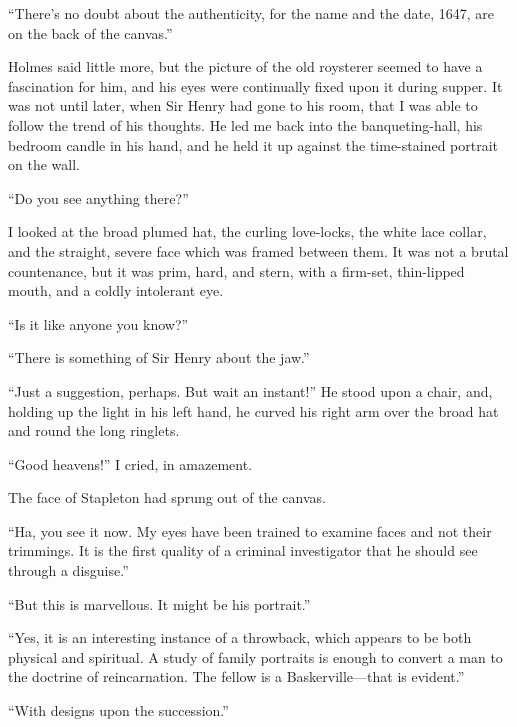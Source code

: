 \documentclass[paper=a5,BCOR=7mm,twoside,DIV=calc,12pt,usegeometry,openany,chapterprefix,endperiod,headings=big]{scrbook} %
\begin{document}
\enquote{There's no doubt about the authenticity, for the name and the date, 1647, are on the back of the canvas.}

Holmes said little more, but the picture of the old roysterer seemed to have a fascination for him, and his eyes were continually fixed upon it during supper. It was not until later, when Sir Henry had gone to his room, that I was able to follow the trend of his thoughts. He led me back into the banqueting-hall, his bedroom candle in his hand, and he held it up against the time-stained portrait on the wall.

\enquote{Do you see anything there?}

I looked at the broad plumed hat, the curling love-locks, the white lace collar, and the straight, severe face which was framed between them. It was not a brutal countenance, but it was prim, hard, and stern, with a firm-set, thin-lipped mouth, and a coldly intolerant eye.

\enquote{Is it like anyone you know?}

\enquote{There is something of Sir Henry about the jaw.}

\enquote{Just a suggestion, perhaps. But wait an instant!} He stood upon a chair, and, holding up the light in his left hand, he curved his right arm over the broad hat and round the long ringlets.

\enquote{Good heavens!} I cried, in amazement.

The face of Stapleton had sprung out of the canvas.

\enquote{Ha, you see it now. My eyes have been trained to examine faces and not their trimmings. It is the first quality of a criminal investigator that he should see through a disguise.}

\enquote{But this is marvellous. It might be his portrait.}

\enquote{Yes, it is an interesting instance of a throwback, which appears to be both physical and spiritual. A study of family portraits is enough to convert a man to the doctrine of reincarnation. The fellow is a Baskerville---that is evident.}

\enquote{With designs upon the succession.}
\end{document}
